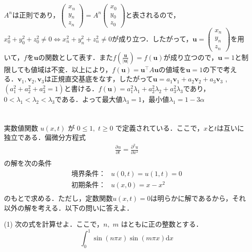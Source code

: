 \documentclass[a4j]{jarticle}
\let \ds \displaystyle
\newcommand{\pdiff}[3]{
  \frac{\partial^{#1} #2}{\partial #3^{#1}}
}
\begin{document}
$A^n$は正則であり，$\begin{pmatrix} x_n \\ y_n \\ z_n \end{pmatrix} = A^n \begin{pmatrix} x_0 \\ y_0 \\ z_0 \end{pmatrix}$と表されるので，$x_0^2+y_0^2+z_0^2 \neq 0 \Leftrightarrow x_n^2+y_n^2+z_n^2 \neq 0$が成り立つ．したがって，$\bm{u}=\begin{pmatrix} x_n \\ y_n \\ z_n \end{pmatrix}$を用いて，$f$を$\bm{u}$の関数として表す．また$\ds f\left(\frac{\bm{u}}{|\bm{u}|}\right)=f(\bm{u})$が成り立つので，$\bm{u}=1$と制限しても値域は不変．以上により，$f(\bm{u})=\bm{u}^\top A\bm{u}$の値域を$\bm{u}=1$の下で考える．$\bm{v}_1,\bm{v}_2,\bm{v}_3$は正規直交基底をなす，したがって$\bm{u}=a_1\bm{v}_1+a_2\bm{v}_2+a_3\bm{v}_3$ , $(a_1^2+a_2^2+a_3^2=1)$と書ける．$f(\bm{u})=a_1^2\lambda_1+a_2^2\lambda_2+a_3^2\lambda_3$であり，$0<\lambda_1<\lambda_2<\lambda_3$である．よって最大値$\lambda_3=1$，最小値$\lambda_1=1-3\alpha$

\section{}

\begin{screen}
 実数値関数 $u(x,t)$ が $0 \leq 1,$ $t\geq 0$ で定義されている．ここで，$x$と$t$は互いに独立である．偏微分方程式
\begin{align*}
 \pdiff{}{u}{t} = \pdiff{2}{u}{x} \tag{$\ast$} \\
\end{align*}
 の解を次の条件
 \begin{align*}
  \mbox{境界条件：} & u(0,t) = u(1,t) = 0 \\
  \mbox{初期条件：} & u(x,0) = x-x^2\\
 \end{align*}
 のもとで求める．ただし，定数関数$u(x,t)=0$は明らかに解であるから，それ以外の解を考える．以下の問いに答えよ．
\end{screen}


\begin{screen}
 (1) 次の式を計算せよ．ここで，$n,$ $m$ はともに正の整数とする．
 $$\int_0^1 \sin(n \pi x) \sin(m \pi x) \mathrm{d}x$$
\end{screen}
\end{document}
